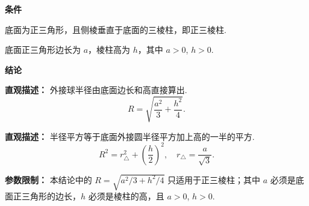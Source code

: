 \begin{statementbox}
	\textbf{\textcolor{CStatement}{条件}}
	\begin{description}[style=nextline, leftmargin=2.8em, labelsep=0.5em, itemsep=0.35em]
		\item[\textbf{\textcolor{CStatement}{条件1（形状条件）：}}] 底面为正三角形，且侧棱垂直于底面的三棱柱，即正三棱柱.
		\item[\textbf{\textcolor{CStatement}{条件2（已知参数）：}}] 底面正三角形边长为 $a$，棱柱高为 $h$，其中 $a>0$, $h>0$.
	\end{description}

	\textbf{\textcolor{CStatement}{结论}}
	\begin{description}[style=nextline, leftmargin=2.8em, labelsep=0.5em, itemsep=0.45em]
		\item[\textbf{\textcolor{CStatement}{结论一（外接球半径）：}}]
		      \textbf{\textcolor{CStatement}{直观描述：}} 外接球半径由底面边长和高直接算出.
		      \[
			      R = \sqrt{\frac{a^{2}}{3} + \frac{h^{2}}{4}}.
		      \]

		\item[\textbf{\textcolor{CStatement}{常见变形（平方拆分）：}}]
		      \textbf{\textcolor{CStatement}{直观描述：}} 半径平方等于底面外接圆半径平方加上高的一半的平方.
		      \[
			      R^{2} = r_{\triangle}^{2} + \left(\frac{h}{2}\right)^{2},\quad
			      r_{\triangle} = \frac{a}{\sqrt{3}}.
		      \]
	\end{description}

	\textbf{\textcolor{CStatement}{参数限制：}} 本结论中的 $R=\sqrt{a^{2}/3+h^{2}/4}$ 只适用于正三棱柱；其中 $a$ 必须是底面正三角形的边长，$h$ 必须是棱柱的高，且 $a>0$, $h>0$.
\end{statementbox}